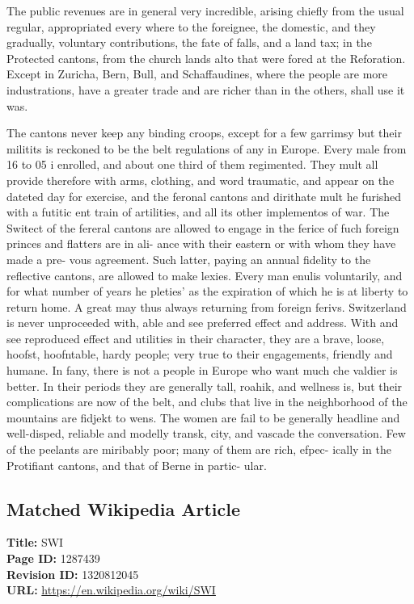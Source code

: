 \documentclass{article}
\begin{document}
The public revenues are in general very incredible,
arising chiefly from the usual regular, appropriated every
where to the foreignee, the domestic, and they gradually,
voluntary contributions, the fate of falls, and a land tax; in
the Protected cantons, from the church lands alto that were
fored at the Reforation. Except in Zuricha, Bern, Bull,
and Schaffaudines, where the people are more industrations,
have a greater trade and are richer than in the others, shall
use it was.

The cantons never keep any binding croops, except for a
few garrimsy but their militits is reckoned to be the belt
regulations of any in Europe. Every male from 16 to 05 i
enrolled, and about one third of them regimented. They
mult all provide therefore with arms, clothing, and word
traumatic, and appear on the dateted day for exercise, and the
feronal cantons and dirithate mult he furished with a futitic
ent train of artilities, and all its other implementos of war.
The Switect of the fereral cantons are allowed to engage
in the ferice of fuch foreign princes and flatters are in ali-
ance with their eastern or with whom they have made a pre-
vous agreement. Such latter, paying an annual fidelity to the
reflective cantons, are allowed to make lexies. Every man
enulis voluntarily, and for what number of years he pleties'
as the expiration of which he is at liberty to return
home. A great may thus always returning from foreign
ferivs. Switzerland is never unproceeded with, able and see
preferred effect and address. With and see
reproduced effect and utilities in their character, they are a brave, loose, hoofst, hoofntable, hardy people;
very true to their engagements, friendly and humane. In
fany, there is not a people in Europe who want much che
valdier is better. In their periods they are generally tall,
roahik, and wellness is, but their complications are now of
the belt, and clubs that live in the neighborhood of the
mountains are fidjekt to wens. The women are fail to be
generally headline and well-disped, reliable and modelly
transk, city, and vascade the conversation. Few of the
peelants are miribably poor; many of them are rich, efpec-
ically in the Protifiant cantons, and that of Berne in partic-
ular.

\subsection*{Matched Wikipedia Article}
\textbf{Title:} SWI \\
\textbf{Page ID:} 1287439 \\
\textbf{Revision ID:} 1320812045 \\
\textbf{URL:} \url{https://en.wikipedia.org/wiki/SWI}
\end{document}
